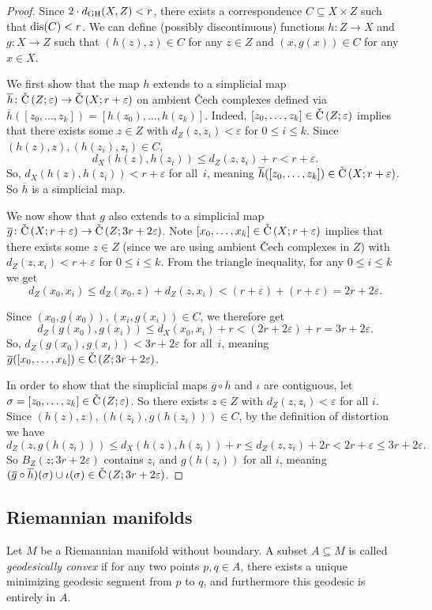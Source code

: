 \documentclass[11pt, reqno, english]{amsart}
\newcommand{\og}{\overline{g}}
\newcommand{\oh}{\overline{h}}
\begin{document}
\begin{proof}
Since $2 \cdot d_{\mathrm{GH}}(X,Z)<r$, there exists a correspondence $C\subseteq X\times Z$ such that $\mathrm{dis}(C)<r$.
We can define (possibly discontinuous) functions $h\colon Z\to X$ and $g\colon X\to Z$ such that $(h(z),z)\in C$ for any $z\in Z$ and $(x,g(x))\in C$ for any $x\in X$.
    
We first show that the map $h$ extends to a simplicial map
$\oh\colon\cech{Z}{\varepsilon}\to \cech{X}{r+\varepsilon}$ on ambient \v{C}ech complexes defined via $\oh([z_0,\ldots,z_k])=[h(z_0),\ldots,h(z_k)]$.
Indeed, $[z_0,\ldots,z_k]\in\mathrm{\check{C}}\left(Z;\varepsilon\right)$ implies that there exists some $z\in Z$ with $d_Z(z,z_i)<\varepsilon$ for $0\leq i\leq k$.
Since $(h(z),z),(h(z_i),z_i)\in C$, 
\[
    d_X(h(z), h(z_i))\leq d_Z(z,z_i)+r<r+\varepsilon.
\]
So, $d_X(h(z),h(z_i))<r+\varepsilon$ for all~$i$, meaning $\oh([z_0,\dots,z_k]) \in \cech{X}{r+\varepsilon}$.
So $\oh$ is a simplicial map.

We now show that $g$ also extends to a simplicial map $\og \colon \cech{X}{r+\varepsilon}\to\cech{Z}{3r+2\varepsilon}$.
Note $[x_0,\ldots,x_k]\in\mathrm{\check{C}}\left(X;r+\varepsilon\right)$ implies that there exists some $z\in Z$ (since we are using ambient \v{C}ech complexes in $Z$) with $d_Z(z,x_i)<r+\varepsilon$ for $0\leq i\leq k$.
From the triangle inequality, for any $0\leq i\leq k$ we get
\[d_Z(x_0,x_i)\leq d_Z(x_0,z) +d_Z(z,x_i)<(r+\varepsilon)+(r+\varepsilon)=2r+2\varepsilon.\]

Since $(x_0,g(x_0)),(x_i,g(x_i))\in C$, we therefore get
\[d_Z(g(x_0), g(x_i))\leq d_X(x_0,x_i)+r<(2r+2\varepsilon)+r=3r+2\varepsilon.\]
So, $d_Z(g(x_0),g(x_i))<3r+2\varepsilon$ for all~$i$, meaning $\og([x_0,\dots,x_k]) \in \cech{Z}{3r+2\varepsilon}$.

In order to show that the simplicial maps $\og\circ\oh$ and $\iota$ are contiguous, let $\sigma=[z_0,\ldots,z_k]\in\mathrm{\check{C}}\left(Z;\varepsilon\right)$.
So there exists $z\in Z$ with $d_Z(z,z_i)<\varepsilon$ for all $i$.
Since $(h(z),z),(h(z_i),g(h(z_i)))\in C$, by the definition of distortion we have
\[
    d_Z(z,g(h(z_i)))\leq d_X(h(z),h(z_i))+r
    \leq d_Z(z,z_i)+2r < 2r+\varepsilon\leq3r+2\varepsilon.
\]
So $B_Z(z;3r+2\varepsilon)$ contains $z_i$ and $g(h(z_i))$ for all $i$, meaning $(\og\circ\oh)(\sigma)\cup\iota(\sigma)\in\cech{Z}{3r+2\varepsilon}$.
\end{proof}


\subsection*{Riemannian manifolds}
Let $M$ be a Riemannian manifold without boundary.
A subset $A\subseteq M$ is called \emph{geodesically convex} if for any two points $p,q\in A$, there exists a unique minimizing geodesic segment from $p$ to $q$, and furthermore this geodesic is entirely in $A$.
\end{document}
